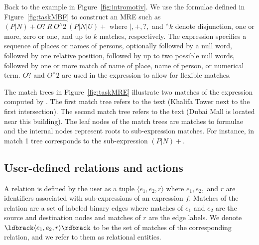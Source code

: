 Back to the example in Figure~\ref{fig:intromotiv}.
We use the formulae defined in Figure~\ref{fig:taskMBF} to construct an MRE such as
$(P|N)\!+O?~R~O^\wedge\!2~(P|N|U)+$ where 
$|,+,?,$ and $^\wedge k$ denote disjunction, one or more, zero or one, and
up to $k$ matches, respectively.
The expression specifies a sequence of places or names of persons, 
optionally followed by a null word, 
followed by one relative position, followed by up to two possible null words, 
followed by one or more match of name of place, name of person, or numerical term.
$O?$ and $O^\wedge 2$ are used in the expression to allow for flexible matches.



The match trees in Figure~\ref{fig:taskMRE} illustrate two matches of the expression computed by \framework.
The first match tree refers to the text 
(Khalifa Tower next to the first intersection).
The second match tree refers to the text 
(Dubai Mall is located near this building).
The leaf nodes of the match trees are matches to formulae and the internal nodes represent roots to sub-expression matches.
For instance,  in match 1 tree corresponds to the sub-expression $(P|N)+$.

\subsection{User-defined relations and actions}

A relation is defined by the user as a tuple 
$\langle e_1,e_2,r\rangle$ where 
$e_1,e_2,$ and $r$ are identifiers associated with 
sub-expressions of an expression $f$.
Matches of the relation are a set of labeled binary edges
where matches of $e_1$ and $e_2$ are the source and destination nodes
and matches of $r$ are the edge labels.
We denote $\ldbrack \langle e_1,e_2,r\rangle \rdbrack$ to be the set of matches of the corresponding relation, 
and we refer to them as relational entities.

